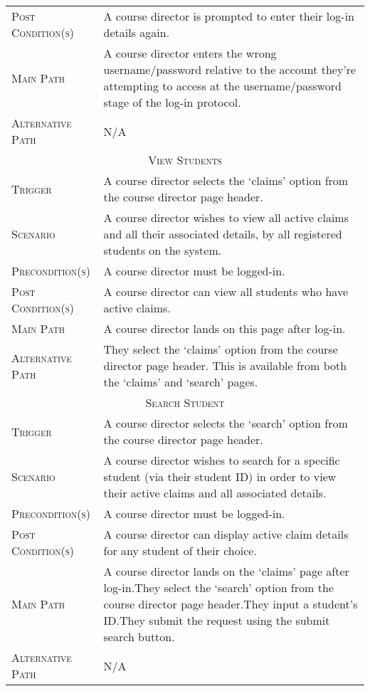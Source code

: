 \documentclass[11pt, english]{article}
\begin{document}
\begin{center}
\begin{longtable}{p{3cm}|p{9cm}}
		\textsc{Post Condition(s)} & A course director is prompted to enter their log-in details again.\\
		\textsc{Main Path} & A course director enters the wrong username/password relative to the account they're attempting to access at the username/password stage of the log-in protocol.\\
		\textsc{Alternative Path} & N/A\\
		\hline
		\multicolumn{2}{c}{\textsc{View Students}}\\
		\hline
		\textsc{Trigger} & A course director selects the `claims' option from the course director page header.\\
		\textsc{Scenario} & A course director wishes to view all active claims and all their associated details, by all registered students on the system.\\
		\textsc{Precondition(s)} & A course director must be logged-in.\\
		\textsc{Post Condition(s)} & A course director can view all students who have active claims.\\
		\textsc{Main Path} & A course director lands on this page after log-in.\\
		\textsc{Alternative Path} & They select the `claims' option from the course director page header. This is available from both the `claims' and `search' pages.\\
		\hline
		\multicolumn{2}{c}{\textsc{Search Student}}\\
		\hline
		\textsc{Trigger} & A course director selects the `search' option from the course director page header.\\
		\textsc{Scenario} & A course director wishes to search for a specific student (via their student ID) in order to view their active claims and all associated details.\\
		\textsc{Precondition(s)} & A course director must be logged-in.\\
		\textsc{Post Condition(s)} & A course director can display active claim details for any student of their choice.\\
		\textsc{Main Path} & A course director lands on the `claims' page after log-in.\newline They select the `search' option from the course director page header.\newline They input a student's ID.\newline They submit the request using the submit search button.\\
		\textsc{Alternative Path} & N/A\\

\end{longtable}
\end{center}
\end{document}
